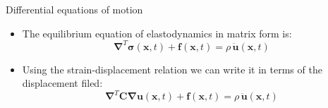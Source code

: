 \documentclass[aspectratio=169]{beamer}
\begin{document}
{
\begin{frame}{Differential equations of motion}
  \begin{block}{}
    \begin{itemize}
      \item The equilibrium equation of elastodynamics in matrix form is:
            $$\boldsymbol\nabla^T\boldsymbol\sigma(\mathbf x,t)+\mathbf f(\mathbf x,t)=\rho\, \mathbf{\ddot{u}}(\mathbf x,t)$$
      \item Using the strain-displacement relation we can write it in terms of the displacement filed:
            $$\boldsymbol\nabla^T\mathbf C\boldsymbol\nabla\mathbf u(\mathbf x,t)+\mathbf f(\mathbf x,t)=\rho\, \mathbf{\ddot{u}}(\mathbf x,t)$$
    \end{itemize}
  \end{block}
\end{frame}
}
\end{document}
